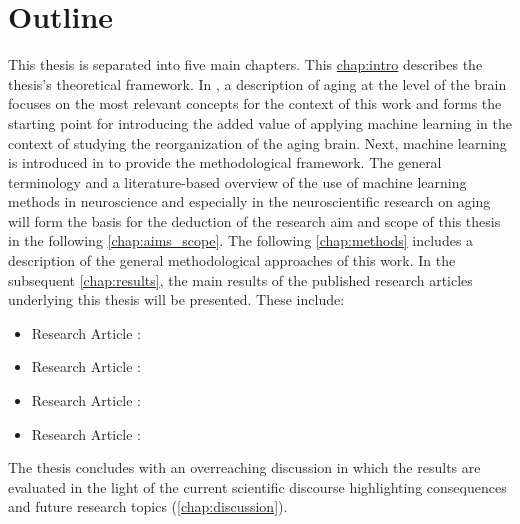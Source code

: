 \section{Outline}
This thesis is separated into five main chapters. This \hyperref[chapter]{chap:intro} describes the thesis's theoretical framework. In , a description of aging at the level of the brain focuses on the most relevant concepts for the context of this work and forms the starting point for introducing the added value of applying machine learning in the context of studying the reorganization of the aging brain. Next, machine learning is introduced in  to provide the methodological framework. The general terminology and a literature-based overview of the use of machine learning methods in neuroscience and especially in the neuroscientific research on aging will form the basis for the deduction of the research aim and scope of this thesis in the following \autoref{chap:aims_scope}. The following \autoref{chap:methods} includes a description of the general methodological approaches of this work. In the subsequent \autoref{chap:results}, the main results of the published research articles underlying this thesis will be presented. These include:

\begin{itemize}
\item Research Article :\\ \hyperref[pub:paperI]{}
\item Research Article :\\ \hyperref[pub:paperI]{}
\item Research Article :\\ \hyperref[pub:paperI]{}
\item Research Article :\\ \hyperref[pub:paperI]{}
\end{itemize}

\noindent The thesis concludes with an overreaching discussion in which the results are evaluated in the light of the current scientific discourse highlighting consequences and future research topics (\autoref{chap:discussion}). 

